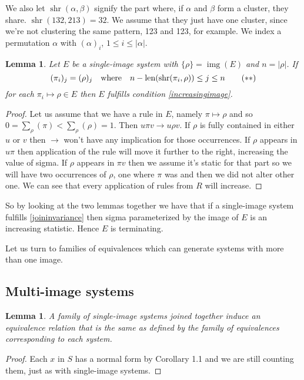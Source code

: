 \documentclass[openany, a4paper, 11pt, english]{article}
\newcommand{\patternrule}{ \mapsto \!}
\newtheorem{lemma}[theorem]{Lemma}
\theoremstyle{definition}
\newcommand{\Sym}{S}
\DeclareMathOperator{\img}{img}
\DeclareMathOperator{\len}{len}
\DeclareMathOperator{\shr}{shr}
\begin{document}
 We also let $\shr(\alpha,
\beta)$ signify the part where, if $\alpha$ and $\beta$ form a cluster, they
share. $\shr(132, 213) = 32$. We assume that they just have one cluster, since
we're not clustering the same pattern, 123 and 123, for example. We index a
permutation $\alpha$ with $(\alpha)_i$, $1 \leq i \leq |\alpha|$.

\begin{lemma}
    Let $E$ be a single-image system with $\{\rho\} = \img(E)$ and $n = |\rho|$. If
    \[
        (\pi_i)_j = (\rho)_j \quad \textnormal{where} \quad n-\len(\shr(\pi_i,
        \rho)) \leq j \leq n \tag{$\ast\ast$} \label{joininvariance}
    \]
    for each $\pi_i \patternrule \rho \in E$ then $E$ fulfills condition
    \eqref{increasingimage}. \end{lemma}
\begin{proof}
    Let us assume that we have a rule in $E$, namely $\pi \patternrule \rho$ and so
    $0 = \sum_\rho(\pi) < \sum_\rho(\rho) = 1$. Then $u \pi v \to u \rho v$. 
    If $\rho$ is fully contained in either $u$ or $v$ then $\to$ won't have any
    implication for those occurrences. If $\rho$ appears in $u\pi$ then
    application of the rule will move it further to the right, increasing the
    value of sigma. If $\rho$ appears in $\pi v$ then we assume it's static for
    that part so we will have two occurrences of $\rho$, one where $\pi$ was and
    then we did not alter other one.
    We can see that every application of rules from $R$ will increase.
\end{proof}

So by looking at the two lemmas together we have that if a single-image system
fulfills \eqref{joininvariance} then sigma parameterized by the image of $E$ is
an increasing statistic. Hence $E$ is terminating.

Let us turn to families of equivalences which can generate systems with more
than one image.

\subsection{Multi-image systems}
\begin{lemma}
    A family of single-image systems joined together induce an equivalence
    relation that is the same as defined by the family of equivalences
    corresponding to each system.
\end{lemma}
\begin{proof}
    Each $x$ in $\Sym$ has a normal form by Corollary 1.1 and we are still counting
    them, just as with single-image systems.
\end{proof}
\end{document}
